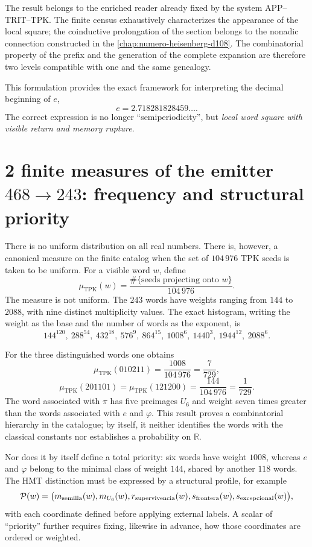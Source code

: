The result belongs to the enriched reader already fixed by the system
APP--TRIT--TPK\@. The finite census exhaustively characterizes the appearance of the
local square; the coinductive prolongation of the section belongs to the
nonadic connection constructed in the
\cref{chap:numero-heisenberg-d108}. The combinatorial property of the prefix and
the generation of the complete expansion are therefore two levels
compatible with one and the same genealogy.

This formulation provides the exact framework for interpreting the
decimal beginning of \(e\),
\[
e=2.718281828459\ldots.
\]
The correct expression is no longer ``semiperiodicity'', but \emph{local word
square with visible return and memory rupture}.

\section{2 finite measures of the emitter \(468\to243\): frequency and structural priority}

There is no uniform distribution on all real numbers. There is, however,
a canonical measure on the finite catalog when the set of \(104\,976\) TPK seeds\@
is taken to be uniform. For a visible word \(w\), define
\[
\mu_{\mathrm{TPK}}(w)
=\frac{\#\{\text{seeds projecting onto }w\}}{104\,976}.
\]
The measure is not uniform. The \(243\) words have weights ranging
from \(144\) to \(2088\), with nine distinct multiplicity values.
The exact histogram, writing the weight as the base and the number of words
as the exponent, is
\[
144^{120},\ 288^{54},\ 432^{18},\ 576^9,\ 864^{15},\
1008^6,\ 1440^3,\ 1944^{12},\ 2088^6.
\]

For the three distinguished words one obtains
\[
\mu_{\mathrm{TPK}}(010211)=\frac{1008}{104\,976}=\frac7{729},
\]
\[
\mu_{\mathrm{TPK}}(201101)
=\mu_{\mathrm{TPK}}(121200)
=\frac{144}{104\,976}=\frac1{729}.
\]
The word associated with \(\pi\) has five preimages \(U_6\) and weight seven
times greater than the words associated with \(e\) and \(\varphi\). This result
proves a combinatorial hierarchy in the catalogue; by itself, it neither identifies
the words with the classical constants nor establishes a probability
on \(\mathbb R\).

Nor does it by itself define a total priority: six words have weight
\(1008\), whereas \(e\) and \(\varphi\) belong to the minimal class of
weight \(144\), shared by another \(118\) words. The HMT distinction must
be expressed by a structural profile, for example
\[
\mathcal P(w)=
\bigl(m_{\rm semilla}(w),m_{U_6}(w),r_{\rm supervivencia}(w),
s_{\rm frontera}(w),s_{\rm excepcional}(w)\bigr),
\]
with each coordinate defined before applying external labels. A scalar of ``priority'' further requires fixing, likewise in advance, how those coordinates are ordered or weighted.
\fi

